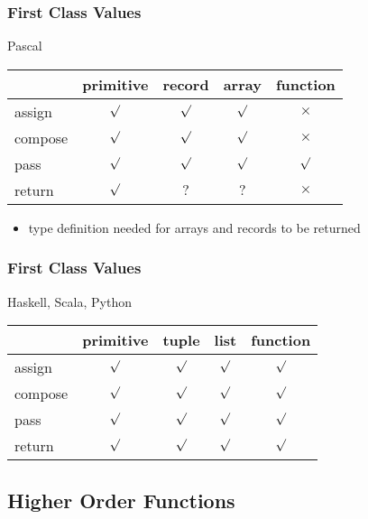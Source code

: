 \documentclass[dvipsnames]{beamer}
\theoremstyle{plain}
\begin{document}
\begin{frame}
  \frametitle{First Class Values}

  \begin{block}{Pascal}
    \begin{table}
      \begin{tabular}{l||c|c|c|c}
                & primitive & record  &  array  & function \\\hline\hline
        assign  &  $\surd$  & $\surd$ & $\surd$ & $\times$ \\\hline
        compose &  $\surd$  & $\surd$ & $\surd$ & $\times$ \\\hline
        pass    &  $\surd$  & $\surd$ & $\surd$ & $\surd$  \\\hline
        return  &  $\surd$  &   $?$   &   $?$   & $\times$
      \end{tabular}
    \end{table}
  \end{block}

  \begin{itemize}
    \item type definition needed for arrays and records to be returned
  \end{itemize}
\end{frame}

\begin{frame}
  \frametitle{First Class Values}

  \begin{block}{Haskell, Scala, Python}
    \begin{table}
      \begin{tabular}{l||c|c|c|c}
                & primitive &  tuple  &  list   & function\\\hline\hline
        assign  &  $\surd$  & $\surd$ & $\surd$ & $\surd$ \\\hline
        compose &  $\surd$  & $\surd$ & $\surd$ & $\surd$ \\\hline
        pass    &  $\surd$  & $\surd$ & $\surd$ & $\surd$ \\\hline
        return  &  $\surd$  & $\surd$ & $\surd$ & $\surd$
      \end{tabular}
    \end{table}
  \end{block}
\end{frame}

\subsection{Higher Order Functions}
\end{document}
